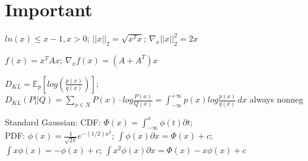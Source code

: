 \section*{Important}
$ln(x) \leq x - 1, x>0$; $||x||_2 = \sqrt{x^T x}$; $\nabla_x ||x||_2^2 = 2 x$%

$f(x) = x^T A x$; $\nabla_x f(x) = (A + A^T) x$

$D_{KL} = \mathbb{E}_p[log(\frac{p(x)}{q(x)})]$; $D_{KL} (P||Q) = \sum_{x \in X}P(x) \cdot log \frac{P(x)}{Q(x)} =  \int_{-\infty}^{+\infty} p(x) log \frac{p(x)}{q(x)} \, dx $ always nonneg

Standard Gaussian: CDF: $\Phi(x) = \int_{-\infty}^{x} \phi(t) \partial t$;\\ %
PDF: $\phi(x) = \frac{1}{\sqrt{2\pi}} e^{-(1/2)x^2}$; $\int \phi(x) \partial x = \Phi(x) + c$;\\
$\int x \phi(x) = -\phi(x) + c$; $\int x^2 \phi(x) \partial x = \Phi(x) -x \phi(x) + c$

